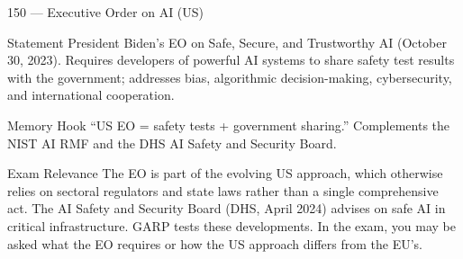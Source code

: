 \documentclass[aspectratio=169,8pt]{beamer}
\begin{document}
	\begin{frame}{150 --- Executive Order on AI (US)}
		\begin{block}{Statement}
			President Biden's EO on Safe, Secure, and Trustworthy AI (October 30, 2023). Requires developers of powerful AI systems to share safety test results with the government; addresses bias, algorithmic decision-making, cybersecurity, and international cooperation.
		\end{block}
		\begin{block}{Memory Hook}
			``US EO = safety tests + government sharing.'' Complements the NIST AI RMF and the DHS AI Safety and Security Board.
		\end{block}
		\begin{block}{Exam Relevance}
			The EO is part of the evolving US approach, which otherwise relies on sectoral regulators and state laws rather than a single comprehensive act. The AI Safety and Security Board (DHS, April 2024) advises on safe AI in critical infrastructure. GARP tests these developments. In the exam, you may be asked what the EO requires or how the US approach differs from the EU's.
		\end{block}
	\end{frame}
	
\end{document}
